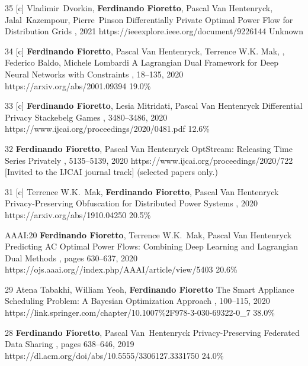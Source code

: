 \begin{pubs}
\confentry 
	{35} %
	{[c] Vladimir~Dvorkin, {\bf Ferdinando Fioretto}, Pascal Van Hentenryck, Jalal~Kazempour, Pierre~Pinson}
	{Differentially Private Optimal Power Flow for Distribution Grids}
	{, 2021}
	{https://ieeexplore.ieee.org/document/9226144}
	{Unknown} %

\confentry
		{34} %
		{[c] {\bf Ferdinando Fioretto}, Pascal Van Hentenryck, Terrence W.K. Mak, , Federico Baldo, Michele Lombardi} 
		{A Lagrangian Dual Framework for Deep Neural Networks with Constraints}
		{\procECML, 18--135, 2020}
		{https://arxiv.org/abs/2001.09394}
		{19.0\%}

	\confentry
		{33} %
		{[c] {\bf Ferdinando Fioretto}, Lesia Mitridati, Pascal Van Hentenryck}
		{Differential Privacy Stackebelg Games}
		{\procIJCAI, 3480--3486, 2020}
		{https://www.ijcai.org/proceedings/2020/0481.pdf}
	    {12.6\%}

\confentryAwd
		{32} %
		{{\bf Ferdinando Fioretto}, Pascal Van Hentenryck}
		{OptStream: Releasing Time Series Privately}
		{\procIJCAI, 5135--5139, 2020}
	    {https://www.ijcai.org/proceedings/2020/722}
		{[Invited to the IJCAI journal track]}
		{(selected papers only.)}{}
	
	\confentry
		{31} %
		{[c] Terrence W.K.~Mak, {\bf Ferdinando Fioretto}, Pascal Van Hentenryck}
		{Privacy-Preserving Obfuscation for Distributed Power Systems}
		{\procPSCC, 2020}
		{https://arxiv.org/abs/1910.04250}
	    {20.5\%} %

\confentry
		{AAAI:20} %
		{{\bf Ferdinando Fioretto}, Terrence W.K.~Mak, Pascal Van Hentenryck}
		{Predicting AC Optimal Power Flows: Combining Deep Learning and Lagrangian Dual Methods}
	  	{\procAAAI, pages 630--637, 2020}
	  	{https://ojs.aaai.org//index.php/AAAI/article/view/5403}
	    {20.6\%} %

	\confentry
		{29} %
	    {Atena Tabakhi, William Yeoh, {\bf Ferdinando Fioretto}}
	    {The Smart Appliance Scheduling Problem: A Bayesian Optimization Approach}
	    {\procPRIMA, 100--115, 2020}
	    {https://link.springer.com/chapter/10.1007\%2F978-3-030-69322-0\_7}
	    {38.0\%} %

	\confentry
		{28} %
		{{\bf Ferdinando Fioretto}, Pascal Van~Hentenryck}
		{Privacy-Preserving Federated Data Sharing}
	  	{\procAAMAS, pages 638--646, 2019}
	  	{https://dl.acm.org/doi/abs/10.5555/3306127.3331750}
		{24.0\%} %


\end{pubs}
